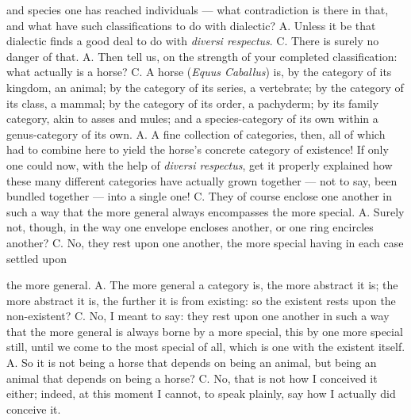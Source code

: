 \documentclass[12pt,a4paper]{book}
\begin{document}
and species one has reached individuals --- what contradiction is there in
that, and what have such classifications to do with dialectic? A. Unless it be
that dialectic finds a good deal to do with \textit{diversi respectus}.
C. There is surely no danger of that. A. Then tell us, on the strength of your
completed classification: what actually is a horse? C. A horse (\textit{Equus
Caballus}) is, by the category of its kingdom, an animal; by the category of
its series, a vertebrate; by the category of its class, a mammal; by the
category of its order, a pachyderm; by its family category, akin to asses and
mules; and a species-category of its own within a genus-category of its own.
A. A fine collection of categories, then, all of which had to combine here to
yield the horse's concrete category of existence! If only one could now, with
the help of \textit{diversi respectus}, get it properly explained how these
many different categories have actually grown together --- not to say, been
bundled together --- into a single one! C. They of course enclose one another
in such a way that the more general always encompasses the more special.
A. Surely not, though, in the way one envelope encloses another, or one ring
encircles another? C. No, they rest upon one another, the more special having
in each case settled upon

the more general. A. The more general a category is, the more abstract it is;
the more abstract it is, the further it is from existing: so the existent rests
upon the non-existent? C. No, I meant to say: they rest upon one another in
such a way that the more general is always borne by a more special, this by one
more special still, until we come to the most special of all, which is one with
the existent itself. A. So it is not being a horse that depends on being an
animal, but being an animal that depends on being a horse? C. No, that is not
how I conceived it either; indeed, at this moment I cannot, to speak plainly,
say how I actually did conceive it.


\end{document}
